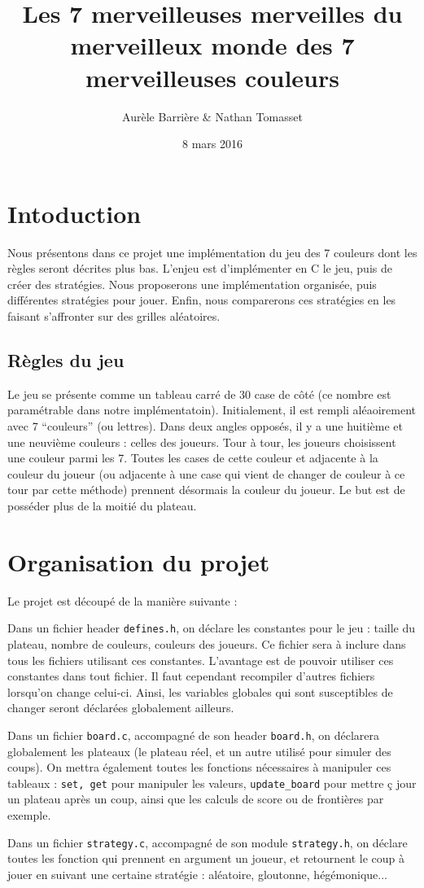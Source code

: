 \documentclass[12pt]{article}
\title{Les 7 merveilleuses merveilles du merveilleux monde des 7 merveilleuses couleurs}
\author{Aurèle Barrière \& Nathan Tomasset}
\date{8 mars 2016}
\def\question#1{\subsection*{#1}}
\def\sec#1{\section{#1}}
\begin{document}
\maketitle
\tableofcontents
\newpage

\sec{Intoduction}
Nous présentons dans ce projet une implémentation du jeu des 7 couleurs dont les règles seront décrites plus bas. L'enjeu est d'implémenter en C le jeu, puis de créer des stratégies.
Nous proposerons une implémentation organisée, puis différentes stratégies pour jouer. Enfin, nous comparerons ces stratégies en les faisant s'affronter sur des grilles aléatoires.


\question{Règles du jeu}
Le jeu se présente comme un tableau carré de 30 case de côté (ce nombre est paramétrable dans notre implémentatoin). Initialement, il est rempli aléaoirement avec 7 ``couleurs'' (ou lettres). Dans deux angles opposés, il y a une huitième et une neuvième couleurs : celles des joueurs. Tour à tour, les joueurs choisissent une couleur parmi les 7. Toutes les cases de cette couleur et adjacente à la couleur du joueur (ou adjacente à une case qui vient de changer de couleur à ce tour par cette méthode) prennent désormais la couleur du joueur. Le but est de posséder plus de la moitié du plateau.

\sec{Organisation du projet}
Le projet est découpé de la manière suivante :

Dans un fichier header \texttt{defines.h}, on déclare les constantes pour le jeu : taille du plateau, nombre de couleurs, couleurs des joueurs. Ce fichier sera à inclure dans tous les fichiers utilisant ces constantes.
L'avantage est de pouvoir utiliser ces constantes dans tout fichier. Il faut cependant recompiler d'autres fichiers lorsqu'on change celui-ci. Ainsi, les variables globales qui sont susceptibles de changer seront déclarées globalement ailleurs.

Dans un fichier \texttt{board.c}, accompagné de son header \texttt{board.h}, on déclarera globalement les plateaux (le plateau réel, et un autre utilisé pour simuler des coups). On mettra également toutes les fonctions nécessaires à manipuler ces tableaux : \texttt{set, get} pour manipuler les valeurs, \texttt{update\_board} pour mettre ç jour un plateau après un coup, ainsi que les calculs de score ou de frontières par exemple.

Dans un fichier \texttt{strategy.c}, accompagné de son module \texttt{strategy.h}, on déclare toutes les fonction qui prennent en argument un joueur, et retournent le coup à jouer en suivant une certaine stratégie : aléatoire, gloutonne, hégémonique...
\end{document}
